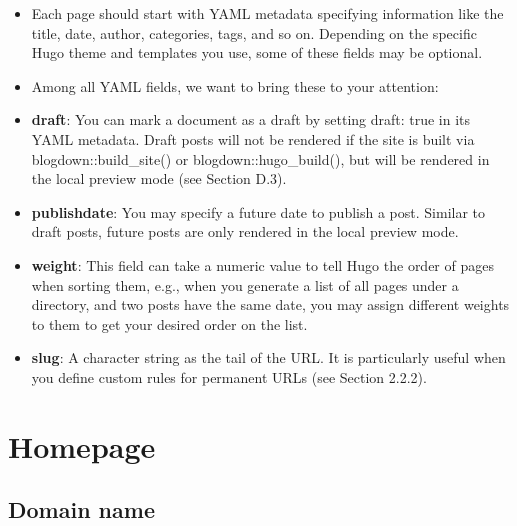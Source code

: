 \documentclass[
]{article}
\providecommand{\tightlist}{%
  \setlength{\itemsep}{0pt}\setlength{\parskip}{0pt}}
\begin{document}
\begin{itemize}
\tightlist
\item
  Each page should start with YAML metadata specifying information
  like the title, date, author, categories, tags, and so on. Depending
  on the specific Hugo theme and templates you use, some of these
  fields may be optional.
\item
  Among all YAML fields, we want to bring these to your attention:
\item
  \textbf{draft}: You can mark a document as a draft by setting draft: true
  in its YAML metadata. Draft posts will not be rendered if the site
  is built via blogdown::build\_site() or blogdown::hugo\_build(), but
  will be rendered in the local preview mode (see Section D.3).
\item
  \textbf{publishdate}: You may specify a future date to publish a post.
  Similar to draft posts, future posts are only rendered in the local
  preview mode.
\item
  \textbf{weight}: This field can take a numeric value to tell Hugo the
  order of pages when sorting them, e.g., when you generate a list of
  all pages under a directory, and two posts have the same date, you
  may assign different weights to them to get your desired order on
  the list.
\item
  \textbf{slug}: A character string as the tail of the URL. It is
  particularly useful when you define custom rules for permanent URLs
  (see Section 2.2.2).
\end{itemize}

\hypertarget{homepage-1}{%
\section{Homepage}\label{homepage-1}}

\hypertarget{domain-name-1}{%
\subsection{Domain name}\label{domain-name-1}}
\end{document}
